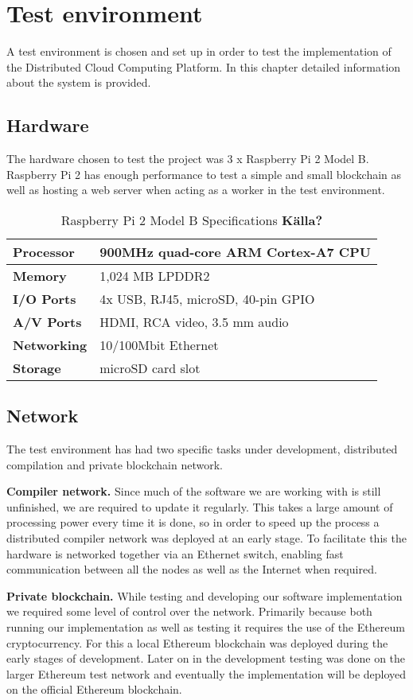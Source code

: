 \section{Test environment}
A test environment is chosen and set up in order to test the implementation of the Distributed Cloud Computing Platform. In this chapter detailed information about the system is provided.

\subsection{Hardware}
The hardware chosen to test the project was 3 x Raspberry Pi 2 Model B. Raspberry Pi 2 has enough performance to test a simple and small blockchain as well as hosting a web server when acting as a worker in the test environment. 

\begin{table}[h]
\centering
\caption{Raspberry Pi 2 Model B Specifications \textbf{Källa?}}
\begin{tabular}{|l|l|}
\hline \textbf{Processor} & 900MHz quad-core ARM Cortex-A7 CPU \\ \hline
\textbf{Memory} & 1,024 MB LPDDR2 \\ \hline 
\textbf{I/O Ports} & 4x USB, RJ45, microSD, 40-pin GPIO \\ \hline
\textbf{A/V Ports} & HDMI, RCA video, 3.5 mm audio \\ \hline
\textbf{Networking} & 10/100Mbit Ethernet \\ \hline
\textbf{Storage} & microSD card slot \\ \hline
\end{tabular}
\end{table}

\subsection{Network}
The test environment has had two specific tasks under development, distributed compilation and private blockchain network.

\textbf{Compiler network.} Since much of the software we are working with is still unfinished, we are required to update it regularly. This takes a large amount of processing power every time it is done, so in order to speed up the process a distributed compiler network was deployed at an early stage. To facilitate this the hardware is networked together via an Ethernet switch, enabling fast communication between all the nodes as well as the Internet when required. 

\textbf{Private blockchain.} While testing and developing our software implementation we required some level of control over the network. Primarily because both running our implementation as well as testing it requires the use of the Ethereum cryptocurrency. For this a local Ethereum blockchain was deployed during the early stages of development. Later on in the development testing was done on the larger Ethereum test network and eventually the implementation will be deployed on the official Ethereum blockchain.

